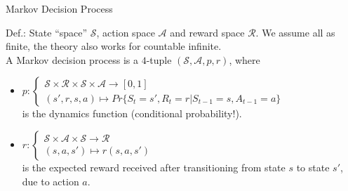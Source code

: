 \documentclass{beamer}
\begin{document}
\begin{frame}{Markov Decision Process}

Def.: State ``space'' $\mathcal{S} $, action space $\mathcal{A}$ and reward space $\mathcal{R}$. We assume all as finite, the theory also works for countable infinite.\\
\vspace{0.3cm}
A Markov decision process is a $4$-tuple $(\mathcal{S}, \mathcal{A}, p, r)$, where \\
\begin{itemize}
\item $p: \begin{cases}\mathcal{S} \times \mathcal{R} \times \mathcal{S} \times \mathcal{A} \rightarrow [0,1] \\ (s',r ,s,a ) \mapsto Pr\{S_t = s', R_t = r| S_{t-1} = s, A_{t-1} = a\}  \end{cases} $ \\ is the dynamics function (conditional probability!). \\
\item $r: \begin{cases} \mathcal{S} \times \mathcal{A} \times \mathcal{S} \rightarrow \mathcal{R} \\ (s, a, s') \mapsto r(s, a, s') \end{cases}$ \\ is the expected reward received after transitioning from state $s$ to state $s'$, due to action $a$.\\
\end{itemize}

\end{frame}
\end{document}
